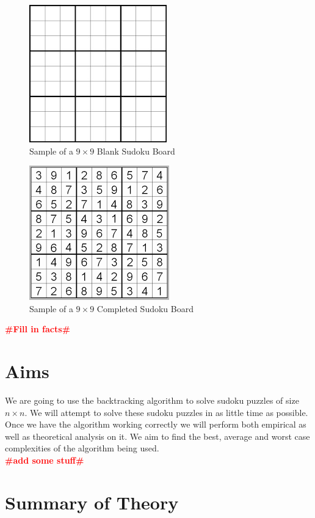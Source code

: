 \documentclass[12pt,a4paper,titlepage]{article}
\newcommand{\todo}[1]{\textcolor{red}{\textbf{\##1\#}}}
\begin{document}
\begin{figure}[h]
\centering
\includegraphics[scale=0.5]{Blank_Sudoku_Board}
\caption{Sample of a $9\times9$ Blank Sudoku Board}
\label{fig:Blank_Sudoku_Board}
\end{figure}
\begin{figure}[h]
\centering
\includegraphics[scale=0.5]{Complete_Sudoku_Board}
\caption{Sample of a $9\times9$ Completed Sudoku Board}
\label{fig:Complete_Sudoku_Board}
\end{figure}

\todo{Fill in facts}

\section{Aims}

We are going to use the backtracking algorithm to solve sudoku puzzles of size $n\times n$. We will attempt to solve these sudoku
puzzles in as little time as possible. Once we have the algorithm working correctly we will perform both empirical as well as
theoretical analysis on it. We aim to find the best, average and worst case complexities of the algorithm being used.
\\
\todo{add some stuff}

\section{Summary of Theory}
\end{document}
